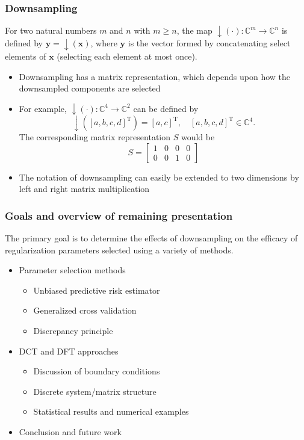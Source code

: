 \documentclass[t]{beamer}
\newcommand{\trans}{\mathrm{T}}	%
\begin{document}
\begin{frame}
\frametitle{Downsampling}
For two natural numbers $m$ and $n$ with $m \geq n$, the map $\downarrow(\cdot) : \mathbb{C}^m \rightarrow \mathbb{C}^{n}$ is defined by $\mathbf{y} = \downarrow(\mathbf{x})$, where $\mathbf{y}$ is the vector formed by concatenating select elements of $\mathbf{x}$ (selecting each element at most once).
\begin{itemize}
\item Downsampling has a matrix representation, which depends upon how the downsampled components are selected
\item For example, $\downarrow(\cdot) : \mathbb{C}^4 \rightarrow \mathbb{C}^2$ can be defined by
\[\downarrow\left([a,b,c,d]^\trans\right) = [a,c]^\trans, \quad [a,b,c,d]^\trans \in \mathbb{C}^4.\]
The corresponding matrix representation $S$ would be
\[S = \begin{bmatrix}
1 & 0 & 0 & 0 \\
0 & 0 & 1 & 0
\end{bmatrix}\]
\item The notation of downsampling can easily be extended to two dimensions by left and right matrix multiplication
\end{itemize}
\end{frame}

\begin{frame}
\frametitle{Goals and overview of remaining presentation}
\begin{block}{}
The primary goal is to determine the effects of downsampling on the efficacy of regularization parameters selected using a variety of methods.
\end{block}
\begin{itemize}
\item Parameter selection methods
\begin{itemize}
\item Unbiased predictive risk estimator
\item Generalized cross validation
\item Discrepancy principle
\end{itemize}
\item DCT and DFT approaches
\begin{itemize}
\item Discussion of boundary conditions
\item Discrete system/matrix structure
\item Statistical results and numerical examples
\end{itemize}
\item Conclusion and future work
\end{itemize}
\end{frame}
\end{document}
